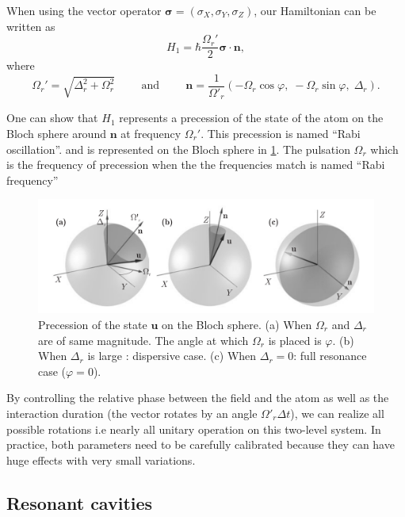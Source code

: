 \documentclass[10pt,a4paper]{report}
\theoremstyle{plain}
\theoremstyle{definition}
\theoremstyle{remark}
\newcommand{\bs}{\boldsymbol}
\begin{document}
When using the vector operator $\bs \sigma = (\sigma_X,\sigma_Y,\sigma_Z)$, our
Hamiltonian can be written as
\begin{equation}\label{eqn:rabi}
H_1 = \hbar \frac{\Omega_r'}2 \bs \sigma \cdot \bs n,
\end{equation}
where
\[ \Omega_r' = \sqrt{\Delta_r^2 + \Omega_r^2} \hspace {1cm}
  \text{and}\hspace{1cm} \bs n = \frac 1 {\Omega'_r}(-\Omega_r \cos \varphi,\;
  -\Omega_r \sin \varphi,\; \Delta_r).\]

One can show that $H_1$ represents a precession of the state of the atom on the
Bloch sphere around $\bs n$ at frequency $\Omega_r'$. This precession is named
``Rabi oscillation''. and is
represented on the Bloch sphere in \cref{fig:rabi}.
The pulsation $\Omega_r$ which is the frequency of
precession when the the frequencies match is named ``Rabi frequency''
\begin{figure}
  \includegraphics[width=\textwidth]{Rabi.png}
  \caption{
    Precession of the state $\bs u$ on the Bloch sphere. (a) When
    $\Omega_r$ and $\Delta_r$ are of same magnitude. The angle at which
    $\Omega_r$ is placed is $\varphi$. (b) When $\Delta_r$ is large :
    dispersive case. (c) When $\Delta_r =0$: full resonance case ($\varphi
    = 0$).
}
  \label{fig:rabi}
\end{figure}

By controlling the relative phase between the field and the atom as well as the
interaction duration (the vector rotates by an angle $\Omega'_r\Delta t$), we
can realize all possible rotations i.e nearly all unitary operation on this
two-level system. In practice, both parameters need to be carefully calibrated
because they can have huge effects with very small variations.

\subsection{Resonant cavities}\label{ssec:rescav}

\end{document}
